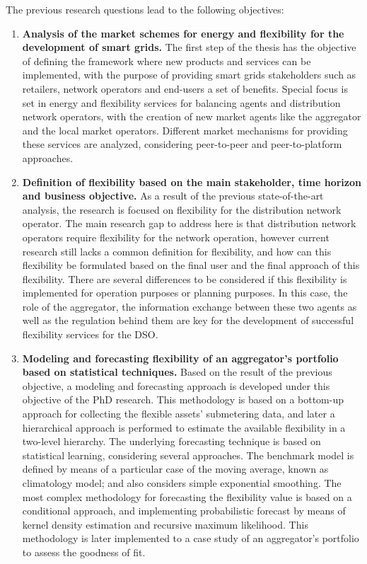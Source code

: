The previous research questions lead to the following objectives:
\begin{enumerate}
\item \textbf{Analysis of the market schemes for energy and flexibility for the development of smart grids.} The first step of the thesis has the objective of defining the framework where new products and services can be implemented, with the purpose of providing smart grids stakeholders such as retailers, network operators and end-users a set of benefits. Special focus is set in energy and flexibility services for balancing agents and distribution network operators, with the creation of new market agents like the aggregator and the local market operators. Different market mechanisms for providing these services are analyzed, considering peer-to-peer and peer-to-platform approaches. 
\item \textbf{Definition of flexibility based on the main stakeholder, time horizon and business objective.} As a result of the previous state-of-the-art analysis, the research is focused on flexibility for the distribution network operator. The main research gap to address here is that distribution network operators require flexibility for the network operation, however current research still lacks a common definition for flexibility, and how can this flexibility be formulated based on the final user and the final approach of this flexibility. There are several differences to be considered if this flexibility is implemented for operation purposes or planning purposes. In this case, the role of the aggregator, the information exchange between these two agents as well as the regulation behind them are key for the development of successful flexibility services for the DSO.  
\item \textbf{Modeling and forecasting flexibility of an aggregator's portfolio based on statistical techniques.} Based on the result of the previous objective, a modeling and forecasting approach is developed under this objective of the PhD research. This methodology is based on a bottom-up approach for collecting the flexible assets' submetering data, and later a hierarchical approach is performed to estimate the available flexibility in a two-level hierarchy. The underlying forecasting technique is based on statistical learning, considering several approaches. The benchmark model is defined by means of a particular case of the moving average, known as climatology model; and also considers simple exponential smoothing. The most complex methodology for forecasting the flexibility value is based on a conditional approach, and implementing probabilistic forecast by means of kernel density estimation and recursive maximum likelihood. This methodology is later implemented to a case study of an aggregator's portfolio to assess the goodness of fit. 

\end{enumerate}
